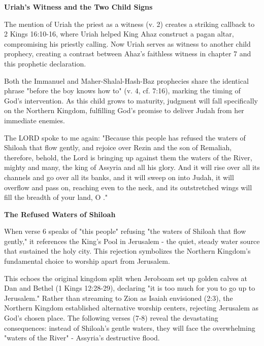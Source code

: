 \documentclass[11pt]{article}
\begin{document}
\vspace{3em}
{\large\bfseries Uriah's Witness and the Two Child Signs}
\vspace{1em}

The mention of Uriah the priest as a witness (v. 2) creates a striking callback to 2 Kings 16:10-16, where Uriah helped King Ahaz construct a pagan altar, compromising his priestly calling. Now Uriah serves as witness to another child prophecy, creating a contrast between Ahaz's faithless witness in chapter 7 and this prophetic declaration.

\vspace{1em}
Both the Immanuel and Maher-Shalal-Hash-Baz prophecies share the identical phrase "before the boy knows how to" (v. 4, cf. 7:16), marking the timing of God's intervention. As this child grows to maturity, judgment will fall specifically on the Northern Kingdom, fulfilling God's promise to deliver Judah from her immediate enemies.

\begin{biblicaloutline}[Isaiah 8:5-8]

    \begin{versesection}{2em}
         The LORD spoke to me again:  "Because this people has refused the waters of Shiloah that flow gently, and rejoice over Rezin and the son of Remaliah,  therefore, behold, the Lord is bringing up against them the waters of the River, mighty and many, the king of Assyria and all his glory. And it will rise over all its channels and go over all its banks,  and it will sweep on into Judah, it will overflow and pass on, reaching even to the neck, and its outstretched wings will fill the breadth of your land, O ."
    \end{versesection}

\end{biblicaloutline}

\vspace{3em}
{\large\bfseries The Refused Waters of Shiloah}
\vspace{1em}

When verse 6 speaks of "this people" refusing "the waters of Shiloah that flow gently," it references the King's Pool in Jerusalem - the quiet, steady water source that sustained the holy city. This rejection symbolizes the Northern Kingdom's fundamental choice to worship apart from Jerusalem.

\vspace{1em}
This echoes the original kingdom split when Jeroboam set up golden calves at Dan and Bethel (1 Kings 12:28-29), declaring "it is too much for you to go up to Jerusalem." Rather than streaming to Zion as Isaiah envisioned (2:3), the Northern Kingdom established alternative worship centers, rejecting Jerusalem as God's chosen place. The following verses (7-8) reveal the devastating consequences: instead of Shiloah's gentle waters, they will face the overwhelming "waters of the River" - Assyria's destructive flood.
\end{document}
